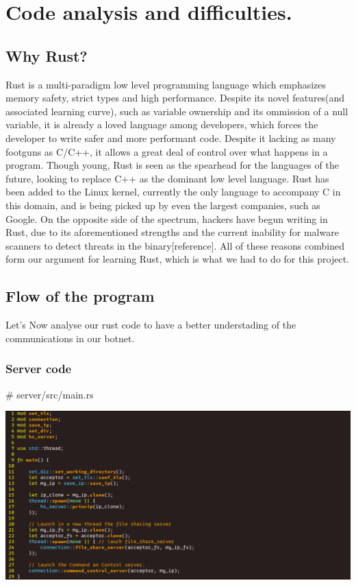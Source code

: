 \documentclass[../main.tex]{subfiles}
\begin{document}
	\chapter{Code analysis and difficulties.}


	\section{Why Rust?}


    Rust is a multi-paradigm low level programming language which emphasizes memory safety, strict types and high performance. 
    Despite its novel features(and associated learning curve), such as variable ownership and its ommission of a null variable, it is already a loved language among developers, which forces the developer to write safer and more performant code.
    Despite it lacking as many footguns as C/C++, it allows a great deal of control over what happens in a program. 
    Though young, Rust is seen as the spearhead for the languages of the future, looking to replace C++ as the dominant low level language. 
    Rust has been added to the Linux kernel, currently the only language to accompany C in this domain, and is being picked up by even the largest companies, such as Google. On the opposite side of the spectrum, hackers have begun writing in Rust, due to its aforementioned strengths and the current inability for malware scanners to detect threats in the binary[reference]. 
    All of these reasons combined form our argument for learning Rust, which is what we had to do for this project.

	\vspace{10pt}

	\section{Flow of the program}

    Let's Now analyse our rust code to have a better understading of the communications in our botnet.
	\vspace{10pt}

	\subsection{Server code}

    \# server/src/main.rs

    \includegraphics[width=450pt]{server_main.png}
\end{document}

